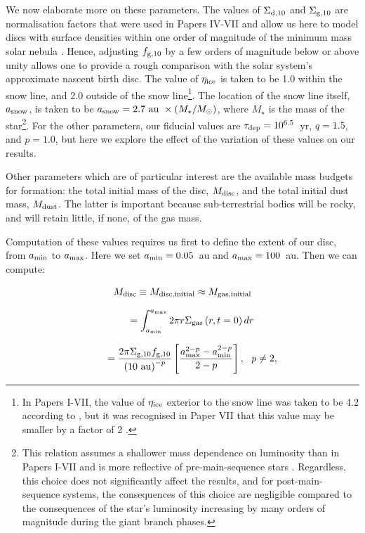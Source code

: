 \documentclass[useAMS,usenatbib]{mn2e}
\newcommand{\rev}{ }
\begin{document}
We now elaborate more on these parameters. The values of $\Sigma_{\rm d,10}$ and $\Sigma_{\rm g,10}$ {\rev are normalisation factors that were used in Papers IV-VII and allow us here to model discs with surface densities within one order of magnitude of} the minimum mass solar nebula \citep[MMSN;][]{hayashi1981}. Hence, adjusting $f_{\rm g,10}$ by a few orders of magnitude below or above unity allows one to provide a rough comparison with the solar system's approximate nascent birth disc. The value of $\eta_{\rm ice}$ is taken to be 1.0 within the snow line, and 2.0 outside of the snow line\footnote{{\rev In Papers I-VII, the value of $\eta_{\rm ice}$ exterior to the snow line was taken to be 4.2 according to \cite{hayashi1981}, but it was recognised in Paper VII that this value may be smaller by a factor of 2 \citep{poletal1994}.}}. The location of the snow line itself, $a_{\rm snow}$, is taken to be $a_{\rm snow}=2.7~{\rm au}~\times \left(M_{\star}/M_{\odot}\right)$, where $M_{\star}$ is the mass of the star\footnote{{\rev This relation assumes a shallower mass dependence on luminosity than in Papers I-VII and is more reflective of pre-main-sequence stars \citep{stapal2004}. Regardless, this choice does not significantly affect the results, and for post-main-sequence systems, the consequences of this choice are negligible compared to the consequences of the star's luminosity increasing by many orders of magnitude during the giant branch phases.}}. For the other parameters, our fiducial values are $\tau_{\rm dep} = 10^{6.5}$~yr, $q=1.5$, and $p=1.0$, but here we explore the effect of the variation of these values on our results. 

Other parameters which are of particular interest are the available mass budgets for formation: the total initial mass of the disc, $M_{\rm disc}$, and the total initial dust mass, $M_{\rm dust}$. The latter is important because sub-terrestrial bodies will be rocky, and will retain little, if none, of the gas mass. 

Computation of these values requires us first to define the extent of our disc, from $a_{\rm min}$ to $a_{\rm max}$. Here we set $a_{\rm min} = 0.05$~au and $a_{\rm max} = 100$~au. Then we can compute:

\[
M_{\rm disc} \equiv M_{\rm disc, initial} \approx M_{\rm gas, initial}
\]

\[
\ \ \ \ \ \
= \int_{a_{\rm min}}^{a_{\rm max}} 2\pi r \Sigma_{\rm gas}\left(r,t=0\right)dr
\]

\[
\ \ \ \ \ \ 
=\frac{2 \pi \Sigma_{\rm g,10}f_{\rm g,10}}{\left(10 \ {\rm au} \right)^{-p}}
\left[
\frac{a_{\rm max}^{2-p} - a_{\rm min}^{2-p}}{2-p}\right], 
\ \ p \ne 2,
\]
\end{document}
